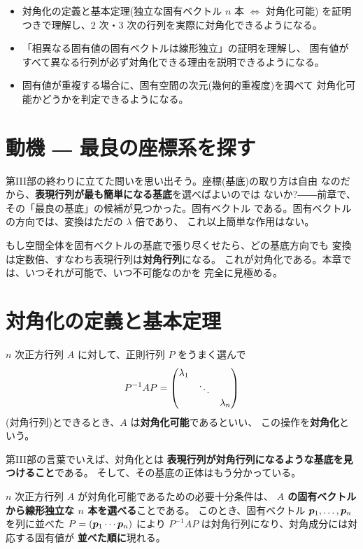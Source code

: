 \begin{goal}
\begin{itemize}
\item 対角化の定義と基本定理(独立な固有ベクトル $n$ 本 $\iff$ 対角化可能)
を証明つきで理解し、$2$ 次・$3$ 次の行列を実際に対角化できるようになる。
\item 「相異なる固有値の固有ベクトルは線形独立」の証明を理解し、
固有値がすべて異なる行列が必ず対角化できる理由を説明できるようになる。
\item 固有値が重複する場合に、固有空間の次元(幾何的重複度)を調べて
対角化可能かどうかを判定できるようになる。
\end{itemize}
\end{goal}

\section{動機 ― 最良の座標系を探す}

第III部の終わりに立てた問いを思い出そう。座標(基底)の取り方は自由
なのだから、\textbf{表現行列が最も簡単になる基底}を選べばよいのでは
ないか?――前章で、その「最良の基底」の候補が見つかった。固有ベクトル
である。固有ベクトルの方向では、変換はただの $\lambda$ 倍であり、
これ以上簡単な作用はない。

もし空間全体を固有ベクトルの基底で張り尽くせたら、どの基底方向でも
変換は定数倍、すなわち表現行列は\textbf{対角行列}になる。
これが対角化である。本章では、いつそれが可能で、いつ不可能なのかを
完全に見極める。

\section{対角化の定義と基本定理}

\begin{teigi}[対角化]
$n$ 次正方行列 $A$ に対して、正則行列 $P$ をうまく選んで
\[
P^{-1} A P = \begin{pmatrix}\lambda_1 & & \\ & \ddots & \\ & & \lambda_n\end{pmatrix}
\]
(対角行列)とできるとき、$A$ は\textbf{対角化可能}であるといい、
この操作を\textbf{対角化}という。
\end{teigi}

第III部の言葉でいえば、対角化とは
\textbf{表現行列が対角行列になるような基底を見つけること}である。
そして、その基底の正体はもう分かっている。

\begin{teiri}[対角化の基本定理]\label{thm:diag-main}
$n$ 次正方行列 $A$ が対角化可能であるための必要十分条件は、
\textbf{$A$ の固有ベクトルから線形独立な $n$ 本を選べる}ことである。
このとき、固有ベクトル $\bm{p}_1, \dots, \bm{p}_n$ を列に並べた
$P = (\bm{p}_1 \cdots \bm{p}_n)$ により
$P^{-1}AP$ は対角行列になり、対角成分には対応する固有値が
\textbf{並べた順に}現れる。
\end{teiri}

